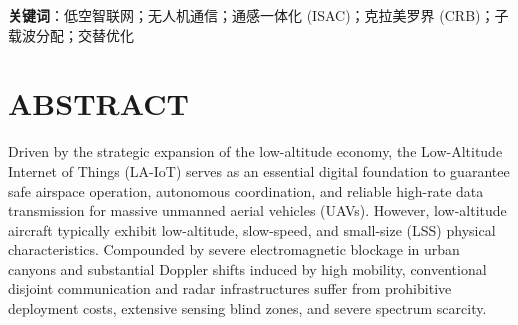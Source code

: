 \documentclass[12pt,a4paper,openany,UTF8]{ctexrep}
\begin{document}
\vspace{0.6cm}
\noindent \textbf{关键词}：低空智联网；无人机通信；通感一体化 (ISAC)；克拉美罗界 (CRB)；子载波分配；交替优化
\newpage

\chapter*{ABSTRACT}

Driven by the strategic expansion of the low-altitude economy, the Low-Altitude Internet of Things (LA-IoT) serves as an essential digital foundation to guarantee safe airspace operation, autonomous coordination, and reliable high-rate data transmission for massive unmanned aerial vehicles (UAVs). However, low-altitude aircraft typically exhibit low-altitude, slow-speed, and small-size (LSS) physical characteristics. Compounded by severe electromagnetic blockage in urban canyons and substantial Doppler shifts induced by high mobility, conventional disjoint communication and radar infrastructures suffer from prohibitive deployment costs, extensive sensing blind zones, and severe spectrum scarcity.
\end{document}
